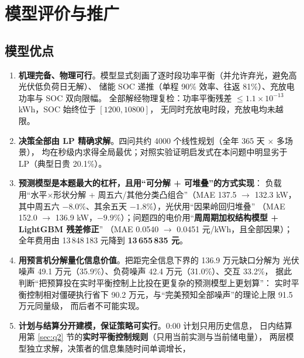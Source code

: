 \section{模型评价与推广}

\subsection{模型优点}

\begin{enumerate}[label=(\arabic*), leftmargin=2.2em, itemsep=2pt]
\item \textbf{机理完备\nobreak、物理可行}\nobreak。模型显式刻画了逐时段功率平衡（并允许弃光\nobreak，避免高光伏低负荷日无解\nobreak）\nobreak、
储能 SOC 递推（单程 90\% 效率\nobreak、往返 81\%\nobreak）\nobreak、充放电功率与 SOC 双向限幅\nobreak。
全部解经物理复检\nobreak：功率平衡残差 $\le1.1\times10^{-13}$ kWh\nobreak，SOC 始终位于 $[1200,10800]$\nobreak，
无同时充放电时段\nobreak，充放电均未越限\nobreak。
\item \textbf{决策全部由 LP 精确求解}\nobreak。四问共约 4000 个线性规划（全年 365 天 $\times$ 多场景\nobreak）\nobreak，
均在秒级内求得全局最优\nobreak；对照实验证明启发式在本问题中明显劣于 LP（典型日贵 20.1\%\nobreak）\nobreak。
\item \textbf{预测模型是本题最大的杠杆\nobreak，且用“可分解 + 可堆叠\nobreak”的方式实现}\nobreak：
负载用“水平$\times$形状分解 + 周五六/其他分类凸组合\nobreak”（MAE 137.5 $\to$ 132.3 kW\nobreak，
其中周五六 $-8.0\%$\nobreak、其余五天 $-1.8\%$\nobreak）\nobreak，光伏用“因果岭回归堆叠\nobreak”
（MAE 152.0 $\to$ 136.9 kW\nobreak，$-9.9\%$\nobreak）\nobreak；问题四的电价用“\textbf{周周期加权结构模型 + LightGBM 残差修正\nobreak}”
（MAE 0.0540 $\to$ 0.0451 元/kWh\nobreak，且全部因果\nobreak）\nobreak；全年费用由 13\,848\,183 元降到 \textbf{13\,655\,835 元}\nobreak。
\item \textbf{用预言机分解量化信息价值}\nobreak。把距完全信息下界的 136.9 万元缺口分解为
光伏噪声 49.1 万元（35.9\%\nobreak）\nobreak、负荷噪声 42.4 万元（31.0\%\nobreak）\nobreak、交互 33.2\%\nobreak，
据此判断“把预算投在实时平衡控制上比投在更复杂的预测模型上更划算\nobreak”\nobreak：
实时平衡控制相对僵硬执行省下 90.2 万元\nobreak，与“完美预知全部噪声\nobreak”的理论上限 91.5 万元同量级\nobreak，
而后者不可能实现\nobreak。
\item \textbf{计划与结算分开建模\nobreak，保证策略可实行}\nobreak。0:00 计划只用历史信息\nobreak，
日内结算用第 \ref{sec:q2} 节的\textbf{实时平衡控制规则}（只用当前实测与当前储电量\nobreak）\nobreak，
两层模型独立求解\nobreak，决策者的信息集随时间单调增长\nobreak，

\end{enumerate}

